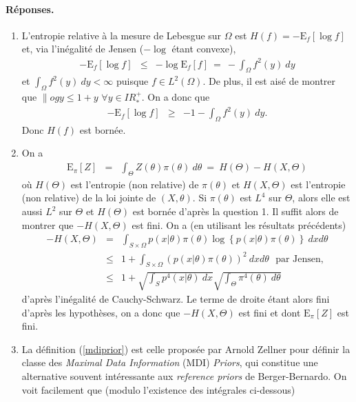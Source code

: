 \documentclass[10pt]{article}
\newcommand{\R}{I\!\!R}
\newcommand{\E}{\mbox{E}}
\newcommand{\1}{\mathbbm{1}}
\begin{document}
\paragraph{\bf R\'eponses.}
\begin{enumerate}
\item L'entropie relative \`a la mesure de Lebesgue sur $\Omega$ est $H(f)=-\E_f[\log f] $ et, via l'in\'egalit\'e de Jensen ($-\log $ \'etant convexe), 
\begin{eqnarray*}
-\E_f[\log f] & \leq & -\log \E_f[ f] \ = \ -\int_{\Omega} f^2(y) \ dy
\end{eqnarray*}
et $\int_{\Omega} f^2(y) \ dy < \infty$ puisque  $f\in L^2(\Omega)$. De plus, il est ais\'e de montrer que  $\|og y \leq 1 + y$ $\forall y\in \R^+_*$. On a donc que
\begin{eqnarray*}
-\E_f[\log f]  & \geq & -1 - \int_{\Omega} f^2(y) \ dy.
\end{eqnarray*}
Donc $H(f)$ est born\'ee. 
\item On a
\begin{eqnarray*}
\E_{\pi}[Z] & = & \int_{\Theta} Z(\theta) \pi(\theta) \ d \theta \ = \ H(\Theta) - H(X,\Theta)
\end{eqnarray*}
o\`u $H(\Theta)$ est l'entropie (non relative) de $\pi(\theta)$ et  $H(X,\Theta)$ est l'entropie (non relative) de la loi jointe de $(X,\theta)$. Si $\pi(\theta)$ est $L^4$ sur $\Theta$, alors elle est aussi $L^2$ sur $\Theta$ et  $H(\Theta)$ est born\'ee d'apr\`es la question 1. Il suffit alors de montrer que $- H(X,\Theta)$ est fini. On a (en utilisant les r\'esultats pr\'ec\'edents)
\begin{eqnarray*}
- H(X,\Theta) & = & \int_{S \times \Omega} p(x|\theta) \pi(\theta) \log \left\{ p(x|\theta) \pi(\theta) \right\} \ dx d\theta \\
& \leq & 1 + \int_{S \times \Omega} \left(p(x|\theta) \pi(\theta)\right)^2  \ dx d\theta \ \ \ \text{par Jensen}, \\
& \leq & 1 + \sqrt{\int_S p^4(x|\theta) \ dx}\sqrt{\int_{\Theta} \pi^4(\theta) \ d\theta}
\end{eqnarray*}
d'apr\`es l'in\'egalit\'e de  Cauchy-Schwarz. Le terme de droite \'etant alors fini d'apr\`es les hypoth\`eses, on a donc que $-H(X,\Theta)$ est fini et dont $\E_{\pi}[Z] $ est fini.
\item La d\'efinition (\ref{mdiprior}) est celle propos\'ee par Arnold Zellner pour d\'efinir la classe des {\it Maximal Data Information} (MDI) {\it Priors}, qui constitue une alternative souvent int\'eressante aux {\it reference priors} de Berger-Bernardo. On voit facilement que (modulo l'existence des int\'egrales ci-dessous) 

\end{enumerate}
\end{document}
